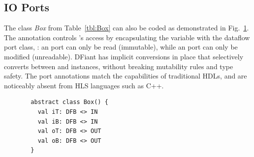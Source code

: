 \subsection{IO Ports}
\label{sec:io_ports}
The class \textit{Box} from Table~\ref{tbl:Box} can also be coded as demonstrated in Fig.~\ref{fig:IOBox}. The annotation  controls 's access by encapsulating the variable with the dataflow port class, : an  port can only be read (immutable), while an  port can only be modified (unreadable). DFiant has implicit conversions in place that selectively converts between  and  instances, without breaking mutability rules and type safety. The port annotations match the capabilities of traditional HDLs, and are noticeably absent from HLS languages such as C++. 


\begin{figure}[h]
  \centering
  \begin{minipage}{0.4\linewidth}
  \begin{verbatim}
  abstract class Box() { 
    val iT: DFB <> IN
    val iB: DFB <> IN
    val oT: DFB <> OUT
    val oB: DFB <> OUT
  }
  \end{verbatim}
  \end{minipage}
  \label{fig:IOBox}
\end{figure}



%
%
%
%
%

